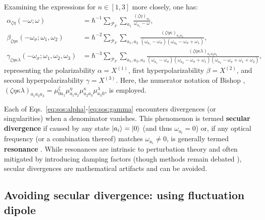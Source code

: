 \documentclass[12pt,a4paper]{article}
\begin{document}
Examining the expressions for $n\in[1,3]$ more closely, one has:
\begin{align}
	\alpha_{\zeta\eta}(-\omega;\omega) &= \hbar^{-1} \sum_{\mathcal{P}_F} \sum_{a_1} \frac{(\zeta\eta)_{a_1}}{\omega_{a_1} - \omega},\label{eq:sos:alpha}\\
	\beta_{\zeta\eta\kappa}(-\omega_\sigma; \omega_1, \omega_2) &= \hbar^{-2} \sum_{\mathcal{P}_F} \sum_{a_1,a_2} \frac{(\zeta\eta\kappa)_{a_1 a_2}}{(\omega_{a_1} - \omega_\sigma)(\omega_{a_2} - \omega_\sigma + \omega_1)},\label{eq:sos:beta}\\
	\gamma_{\zeta\eta\kappa\lambda}(-\omega_\sigma; \omega_1, \omega_2, \omega_3) &= \hbar^{-3} \sum_{\mathcal{P}_F} \sum_{a_1, a_2, a_3} \frac{(\zeta\eta\kappa\lambda)_{a_1 a_2 a_3}}{(\omega_{a_1} - \omega_\sigma)(\omega_{a_2} - \omega_\sigma + \omega_1)(\omega_{a_3} - \omega_\sigma + \omega_1 + \omega_2)},\label{eq:sos:gamma}
\end{align}
representing the polarizability $\alpha = X^{(1)}$, first hyperpolarizability $\beta = X^{(2)}$, and second hyperpolarizability $\gamma = X^{(3)}$. Here, the numerator notation of Bishop \cite{bishopExplicitNondivergentFormulas1994}, $(\zeta\eta\kappa\lambda)_{a_1 a_2 a_3} = \mu_{0 a_1}^\zeta \mu_{a_1 a_2}^\eta \mu_{a_2 a_3}^\kappa \mu_{a_3 0}^\lambda$, is employed.

Each of Eqs.~\eqref{eq:sos:alpha}-\eqref{eq:sos:gamma} encounters divergences (or singularities) when a denominator vanishes. This phenomenon is termed \textbf{secular divergence} if caused by any state $\ket{a_i} = \ket{0}$ (and thus $\omega_{a_i} = 0$) or, if any optical frequency (or a combination thereof) matches $\omega_{a_i} \neq 0$, is generally termed \textbf{resonance} \cite{bishopExplicitNondivergentFormulas1994}. While resonances are intrinsic to perturbation theory and often mitigated by introducing damping factors (though methods remain debated \cite{campoPracticalModelFirst2012a}), secular divergences are mathematical artifacts and can be avoided. 

\subsection{Avoiding secular divergence: using fluctuation dipole}
\end{document}

